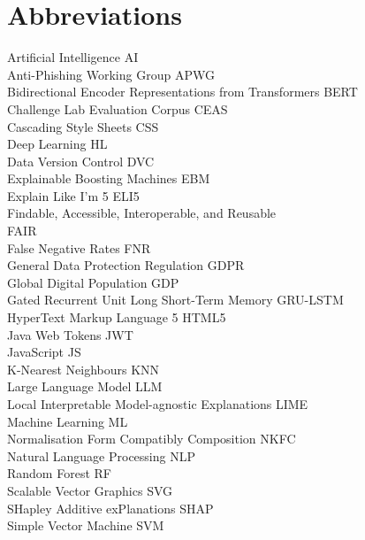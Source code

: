 
\section*{Abbreviations}

\large
Artificial Intelligence \hfill AI\\
Anti-Phishing Working Group \hfill APWG\\
Bidirectional Encoder Representations from Transformers \hfill BERT\\
Challenge Lab Evaluation Corpus \hfill CEAS\\
Cascading Style Sheets \hfill CSS\\
Deep Learning \hfill HL\\
Data Version Control \hfill DVC\\
Explainable Boosting Machines \hfill EBM\\
Explain Like I'm 5 \hfill ELI5 \\
Findable, Accessible, Interoperable, and Reusable \hfill \\ FAIR \\
False Negative Rates \hfill FNR \\
General Data Protection Regulation \hfill GDPR\\
Global Digital Population \hfill GDP\\
Gated Recurrent Unit Long Short-Term Memory \hfill GRU-LSTM\\
HyperText Markup Language 5 \hfill HTML5\\
Java Web Tokens \hfill JWT\\
JavaScript \hfill JS\\
K-Nearest Neighbours \hfill KNN\\
Large Language Model \hfill LLM\\
Local Interpretable Model-agnostic Explanations \hfill LIME\\
Machine Learning \hfill ML\\
Normalisation Form Compatibly Composition \hfill NKFC\\
Natural Language Processing \hfill NLP \\
Random Forest \hfill RF \\
Scalable Vector Graphics \hfill SVG\\
SHapley Additive exPlanations \hfill SHAP\\
Simple Vector Machine \hfill SVM\\

